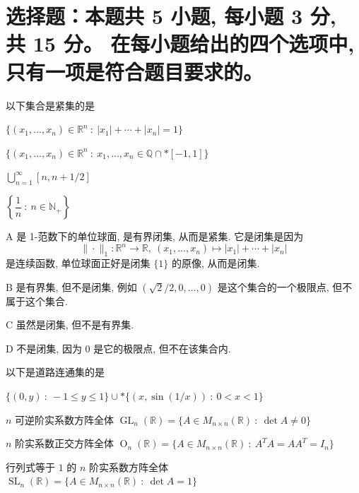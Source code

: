 


\makeexamtitle



\section{%
  选择题：本题共 5 小题, 每小题 3 分, 共 15 分。
  在每小题给出的四个选项中, 只有一项是符合题目要求的。
}


\begin{question}
以下集合是紧集的是 \paren[A]

\begin{choices}
\item $\{ (x_1, \dots, x_n) \in \mathbb{R}^n ~ : ~ |x_1| + \cdots + |x_n| = 1 \}$
\item $\{ (x_1, \dots, x_n) \in \mathbb{R}^n ~ : ~ x_1, \dots, x_n \in \mathbb{Q} \cap* [-1, 1] \}$
\item $\displaystyle \bigcup_{n=1}^{\infty} [n, n + 1/2]$
\item $\displaystyle \left\{ \dfrac{1}{n} ~ : ~ n \in \mathbb{N}_+ \right\}$
\end{choices}
\end{question}

\begin{solution}
A 是 1-范数下的单位球面, 是有界闭集, 从而是紧集. 它是闭集是因为
$$
\| \cdot \|_1: \mathbb{R}^n \rightarrow \mathbb{R}, ~ (x_1, \dots, x_n) \mapsto |x_1| + \cdots + |x_n|
$$
是连续函数, 单位球面正好是闭集 $\{1\}$ 的原像, 从而是闭集.

B 是有界集, 但不是闭集, 例如 $(\sqrt{2}/2, 0, \dots, 0)$ 是这个集合的一个极限点, 但不属于这个集合.

C 虽然是闭集, 但不是有界集.

D 不是闭集, 因为 $0$ 是它的极限点, 但不在该集合内.
\end{solution}


\begin{question}
以下是道路连通集的是 \paren[D]

\begin{choices}
\item $\{ (0,y) ~:~ -1\leqslant y \leqslant 1\} \cup* \{ (x, \sin(1/x)) ~:~ 0 < x < 1 \}$
\item $n$ 可逆阶实系数方阵全体 $\operatorname{GL}_n(\mathbb{R}) = \{ A \in M_{n \times n}(\mathbb{R}) ~:~ \det A \neq 0 \}$
\item $n$ 阶实系数正交方阵全体 $\operatorname{O}_n(\mathbb{R}) = \{ A \in M_{n \times n}(\mathbb{R}) ~:~ A^TA = AA^T = I_n \}$
\item 行列式等于 $1$ 的 $n$ 阶实系数方阵全体 $\operatorname{SL}_n(\mathbb{R}) = \{ A \in M_{n \times n}(\mathbb{R}) ~:~ \det A = 1 \}$
\end{choices}
\end{question}

